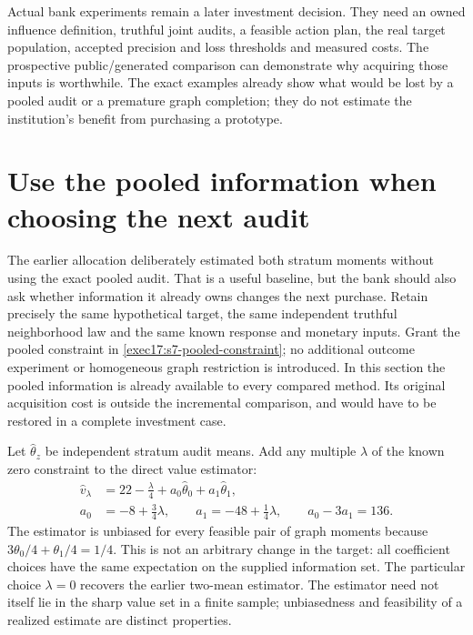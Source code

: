 Actual bank experiments remain a later investment decision. They need an
owned influence definition, truthful joint audits, a feasible action plan,
the real target population, accepted precision and loss thresholds and
measured costs. The prospective public/generated comparison can demonstrate
why acquiring those inputs is worthwhile. The exact examples already show
what would be lost by a pooled audit or a premature graph completion; they
do not estimate the institution's benefit from purchasing a prototype.



\section{Use the pooled information when choosing the next audit}
\label{exec17:s7-constraint-design}

The earlier allocation deliberately estimated both stratum moments without
using the exact pooled audit. That is a useful baseline, but the bank should
also ask whether information it already owns changes the next purchase.
Retain precisely the same hypothetical target, the same independent truthful
neighborhood law and the same known response and monetary inputs. Grant the
pooled constraint in \eqref{exec17:s7-pooled-constraint}; no additional outcome
experiment or homogeneous graph restriction is introduced. In this section
the pooled information is already available to every compared method. Its
original acquisition cost is outside the incremental comparison, and would
have to be restored in a complete investment case.

Let $\widehat\theta_z$ be independent stratum audit means. Add any multiple
$\lambda$ of the known zero constraint to the direct value estimator:
\begin{equation}
 \begin{split}
  \widehat v_\lambda
   &=22-\tfrac\lambda4+a_0\widehat\theta_0+a_1\widehat\theta_1,\\
  a_0&=-8+\tfrac34\lambda,\qquad
  a_1=-48+\tfrac14\lambda,\qquad a_0-3a_1=136.
 \end{split}
 \label{exec17:s7-constrained-estimator}
\end{equation}
The estimator is unbiased for every feasible pair of graph moments because
$3\theta_0/4+\theta_1/4=1/4$. This is not an arbitrary change in the target:
all coefficient choices have the same expectation on the supplied information
set. The particular choice $\lambda=0$ recovers the earlier two-mean estimator.
The estimator need not itself lie in the sharp value set in a finite sample;
unbiasedness and feasibility of a realized estimate are distinct properties.

